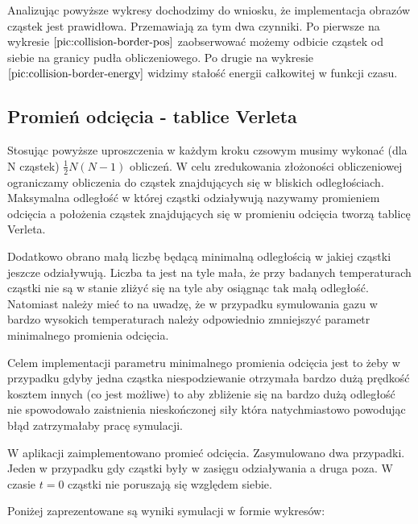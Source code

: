 \documentclass[a4paper,10pt]{article}
\begin{document}
Analizując powyższe wykresy dochodzimy do wniosku, że implementacja obrazów cząstek jest prawidłowa. Przemawiają za tym dwa czynniki. Po pierwsze na wykresie $\ref{pic:collision-border-pos}$ zaobserwować możemy odbicie cząstek od siebie na granicy pudła obliczeniowego. Po drugie na wykresie $\ref{pic:collision-border-energy}$ widzimy stałość energii całkowitej w funkcji czasu.

\subsection{Promień odcięcia - tablice Verleta}

Stosując powyższe uproszczenia w każdym kroku czsowym musimy wykonać (dla N cząstek) $\frac{1}{2} N (N-1)$ obliczeń. W celu zredukowania złożoności obliczeniowej ograniczamy obliczenia do cząstek znajdujących się w bliskich odległościach. Maksymalna odległość w której cząstki odziaływują nazywamy promieniem odcięcia a położenia cząstek znajdujących się w promieniu odcięcia tworzą tablicę Verleta.

Dodatkowo obrano małą liczbę będącą minimalną odległością w jakiej cząstki jeszcze odziaływują. Liczba ta jest na tyle mała, że przy badanych temperaturach cząstki nie są w stanie zliżyć się na tyle aby osiągnąc tak małą odległość. Natomiast należy mieć to na uwadzę, że w przypadku symulowania gazu w bardzo wysokich temperaturach należy odpowiednio zmniejszyć parametr minimalnego promienia odcięcia.

Celem implementacji parametru minimalnego promienia odcięcia jest to żeby w przypadku gdyby jedna cząstka niespodziewanie otrzymała bardzo dużą prędkość kosztem innych (co jest możliwe) to aby zbliżenie się na bardzo dużą odległość nie spowodowało zaistnienia nieskończonej siły która natychmiastowo powodując błąd zatrzymałaby pracę symulacji.

W aplikacji zaimplementowano promieć odcięcia. Zasymulowano dwa przypadki. Jeden w przypadku gdy cząstki były w zasięgu odziaływania a druga poza. W czasie $t=0$ cząstki nie poruszają się względem siebie.

Poniżej zaprezentowane są wyniki symulacji w formie wykresów:
\end{document}
